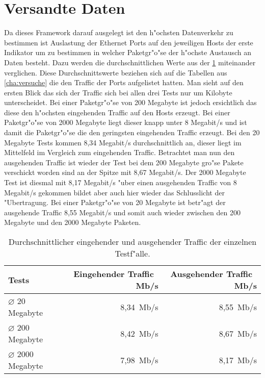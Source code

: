 \section{Versandte Daten}
\label{sec:verschickteDaten}
Da dieses Framework darauf ausgelegt ist den h"ochsten Datenverkehr zu bestimmen ist %
Auslastung der Ethernet Ports auf den jeweiligen Hosts der erste Indikator um zu bestimmen %
in welcher Paketgr"o"se der h"ochste Austausch an Daten besteht. Dazu werden die durchschnittlichen %
Werte aus der \cref{tab:compTraffic} miteinander verglichen. Diese Durchschnittswerte beziehen sich %
auf die Tabellen aus \cref{cha:versuche} die den Traffic der Ports aufgelistet hatten. Man sieht %
auf den ersten Blick das sich der Traffic sich bei allen drei Tests nur um Kilobyte unterscheidet. %
Bei einer Paketgr"o"se von 200 Megabyte ist jedoch ersichtlich das diese den h"ochsten eingehenden %
Traffic auf den Hosts erzeugt. Bei einer Paketgr"o"se von 2000 Megabyte liegt dieser knapp unter %
8 Megabit/s und ist damit die Paketgr"o"se die den geringsten eingehenden Traffic erzeugt. Bei %
den 20 Megabyte Tests kommen 8,34 Megabit/s durchschnittlich an, dieser liegt im Mittelfeld %
im Vergleich zum eingehenden Traffic. Betrachtet man nun den ausgehenden Traffic ist wieder %
der Test bei dem 200 Megabyte gro"se Pakete verschickt worden sind an der Spitze mit 8,67 %
Megabit/s. Der 2000 Megabyte Test ist diesmal mit 8,17 Megabit/s "uber einen ausgehenden %
Traffic von 8 Megabit/s gekommen bildet aber auch hier wieder das Schlusslicht der "Ubertragung. %
Bei einer Paketgr"o"se von 20 Megabyte ist betr"agt der ausgehende Traffic 8,55 Megabit/s und %
somit auch wieder zwischen den 200 Megabyte und den 2000 Megabyte Paketen. %

\begin{table}
\centering
\begin{tabular}{l%
 r<{\,Mb/s}%
 r<{\,Mb/s}%
}
Tests  					& Eingehender Traffic	& Ausgehender Traffic	\\
\hline
$\diameter$ \hspace{8pt} 20 Megabyte  	& 8,34			& 8,55 			\\
$\diameter$ \hspace{6pt}200 Megabyte  	& 8,42			& 8,67			\\
$\diameter$ 2000 Megabyte	  	& 7,98			& 8,17			\\
\end{tabular}
\caption{Durchschnittlicher eingehender und ausgehender Traffic der einzelnen Testf"alle.}
\label{tab:compTraffic}

\end{table}

